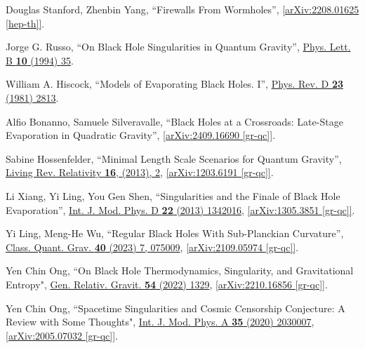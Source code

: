 \documentclass[preprintnumbers, floatfix, preprintnumbers, letterpaper, twocolumn, superscriptaddress,nofootinbib]{revtex4-2}
\begin{document}
\begin{thebibliography}{99}
Douglas Stanford, Zhenbin Yang, ``Firewalls From Wormholes'', \href{https://arxiv.org/abs/2208.01625}{[arXiv:2208.01625 [hep-th]]}.

Jorge G. Russo, ``On Black Hole Singularities in Quantum Gravity'', {\hypersetup{urlcolor=vividviolet}\href{https://www.sciencedirect.com/science/article/abs/pii/0370269394911290}{Phys. Lett. B \textbf{10} (1994) 35}}.

William A. Hiscock, ``Models of Evaporating Black Holes. I'', {\hypersetup{urlcolor=vividviolet}\href{https://journals.aps.org/prd/abstract/10.1103/PhysRevD.23.2813}{Phys. Rev. D \textbf{23} (1981) 2813}}.

Alfio Bonanno, Samuele Silveravalle, ``Black Holes at a Crossroads: Late-Stage Evaporation in Quadratic Gravity'', \href{https://arxiv.org/abs/2409.16690}{[arXiv:2409.16690 [gr-qc]]}.

Sabine Hossenfelder, ``Minimal Length Scale Scenarios for Quantum Gravity'', {\hypersetup{urlcolor=vividviolet}\href{https://link.springer.com/article/10.12942/lrr-2013-2}{Living Rev. Relativity \textbf{16}, (2013), 2}}, \href{https://arxiv.org/abs/1203.6191}{[arXiv:1203.6191 [gr-qc]]}.


Li Xiang, Yi Ling, You Gen Shen, ``Singularities and the Finale of Black Hole Evaporation'', {\hypersetup{urlcolor=vividviolet}\href{https://www.worldscientific.com/doi/abs/10.1142/S0218271813420169}{Int. J. Mod. Phys. D \textbf{22} (2013) 1342016}}, \href{https://arxiv.org/abs/1305.3851}{[arXiv:1305.3851 [gr-qc]]}.

Yi Ling, Meng-He Wu, ``Regular Black Holes With Sub-Planckian Curvature'', {\hypersetup{urlcolor=vividviolet}\href{https://iopscience.iop.org/article/10.1088/1361-6382/acc0c9}{Class. Quant. Grav. \textbf{40} (2023) 7, 075009}}, \href{https://arxiv.org/abs/2109.05974}{[arXiv:2109.05974 [gr-qc]]}.


Yen Chin Ong, ``On Black Hole Thermodynamics, Singularity, and Gravitational Entropy",  {\hypersetup{urlcolor=vividviolet}\href{https://link.springer.com/article/10.1007/s10714-022-03008-0}{Gen. Relativ. Gravit. \textbf{54} (2022) 1329}},  \href{https://arxiv.org/abs/2210.16856}{[arXiv:2210.16856 [gr-qc]]}.

Yen Chin Ong, ``Spacetime Singularities and Cosmic Censorship Conjecture: A Review with Some Thoughts", {\hypersetup{urlcolor=vividviolet}\href{https://www.worldscientific.com/doi/abs/10.1142/S0217751X20300070}{Int. J. Mod. Phys. A \textbf{35} (2020) 2030007}}, \href{https://arxiv.org/abs/2005.07032}{[arXiv:2005.07032 [gr-qc]]}.



\end{thebibliography}
\end{document}
